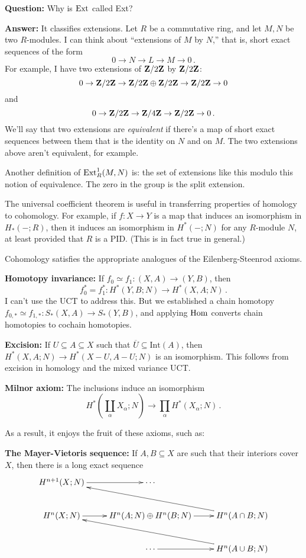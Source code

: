 \begin{remark}
\textbf{Question:} Why is $\operatorname{Ext}$ called Ext?

\noindent
\textbf{Answer:} It classifies extensions. Let $R$ be a commutative ring, and let $M,N$ be two $R$-modules. I can think about ``extensions of $M$ by $N$,''
that is, short exact sequences of the form
\[
0\to N\to L\to M\to 0\,.
\]
For example, I have two extensions of $\mathbf Z/2\mathbf Z$ by $\mathbf Z/2\mathbf Z$: 
\[
0\to\mathbf Z/2\mathbf Z\to\mathbf Z/2\mathbf Z\oplus\mathbf Z/2\mathbf Z\to\mathbf Z/2\mathbf Z\to 0
\]
and
\[0\to \mathbf Z/2\mathbf Z\to\mathbf Z/4\mathbf Z\to\mathbf Z/2\mathbf Z\to 0\,.
\]
We'll say that two extensions are {\em equivalent} if there's a map of short exact sequences between them that is the identity on $N$ and on $M$. The two extensions above aren't equivalent, for example.

Another definition of $\operatorname{Ext}^1_R(M,N)$ is: the set of extensions like this modulo this notion of equivalence. The zero in the group is the split extension.
\end{remark}

The universal coefficient theorem is useful in transferring properties of 
homology to cohomology. For example, if $f:X\to Y$ is a map that induces an
isomorphism in $H_*(-;R)$, then it induces an isomorphism in $H^*(-;N)$ for
any $R$-module $N$, at least provided that $R$ is a PID. (This is in fact 
true in general.) 

Cohomology satisfies the appropriate analogues of the Eilenberg-Steenrod axioms.

\noindent
\textbf{Homotopy invariance:}
If $f_0\simeq f_1:(X,A)\to (Y,B)$, then 
\[
f_0^*=f_1^*:H^\ast(Y,B;N)\to H^\ast(X,A;N)\,.
\]
I can't use the UCT to address this. But we established a chain homotopy $f_{0,\ast}\simeq f_{1,\ast}:S_\ast(X,A)\to S_\ast(Y,B)$, and applying $\operatorname{Hom}$ converts chain homotopies to cochain homotopies. 

\noindent
\textbf{Excision:} If $U\subseteq A\subseteq X$ such that $\overline{U}\subseteq\mathrm{Int}(A)$, then $ H^\ast(X,A;N)\to H^\ast(X-U,A-U;N)$ is an isomorphism. This follows from excision in homology and the mixed variance UCT.

\noindent
\textbf{Milnor axiom:} The inclusions induce an isomorphism
\[
H^*(\coprod_\alpha X_\alpha;N)\to \prod_\alpha H^*(X_\alpha;N)\,.
\]

As a result, it enjoys the fruit of these axioms, such as:

\noindent
\textbf{The Mayer-Vietoris sequence:} If $A,B\subseteq X$ are such that their interiors cover $X$, then there is a long exact sequence
\begin{equation*}
\xymatrix{ 
 H^{n+1}(X;N)\ar[r] & \cdots \\
 H^n(X;N)\ar[r] & H^n(A;N)\oplus H^n(B;N)\ar[r] & H^n(A\cap B;N)\ar[ull]\\
& \cdots \ar[r] & H^n(A\cup B;N) \ar[ull]
}
\end{equation*}







